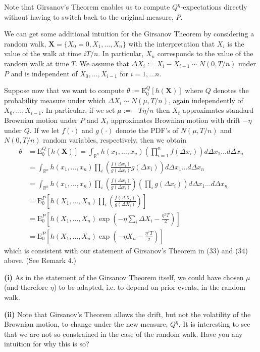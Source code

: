 \begin{remark}
Note that Girsanov's Theorem enables us to compute $Q^\eta$-expectations directly without having to switch back to the original measure, $P$.
\end{remark}

We can get some additional intuition for the Girsanov Theorem by considering a random walk, $\mathbf{X}=\{X_0=0,X_1,\ldots,X_n\}$ with the interpretation that $X_i$ is the value of the walk at time $iT/n$. In particular, $X_n$ corresponds to the value of the random walk at time $T$. We assume that $\Delta X_i:=X_i-X_{i-1}\sim N(0,T/n)$ under $P$ and is independent of $X_0,\ldots,X_{i-1}$ for $i=1,\ldots n$.

\begin{example}
Suppose now that we want to compute $\theta:=\mathrm{E}_0^Q[h(\mathbf{X})]$ where $Q$ denotes the probability measure under which $\Delta X_i\sim N(\mu,T/n)$, again independently of $X_0,\ldots,X_{i-1}$. In particular, if we set $\mu:=-T\eta/n$ then $X_t$ approximates standard Brownian motion under $P$ and $X_t$ approximates Brownian motion with drift $-\eta$ under $Q$. If we let $f(\cdot)$ and $g(\cdot)$ denote the PDF's of $N(\mu,T/n)$ and $N(0,T/n)$ random variables, respectively, then we obtain
\begin{align*}
\theta &= \mathrm{E}_0^Q[h(\mathbf{X})] = \int_{\mathbb{R}^n} h(x_1,\ldots,x_n) \left(\prod_{i=1}^n f(\Delta x_i)\right) d\Delta x_1\ldots d\Delta x_n \\
&= \int_{\mathbb{R}^n} h(x_1,\ldots,x_n) \prod_i \left(\frac{f(\Delta x_i)}{g(\Delta x_i)} g(\Delta x_i)\right) d\Delta x_1\ldots d\Delta x_n \\
&= \int_{\mathbb{R}^n} h(x_1,\ldots,x_n) \prod_i \left(\frac{f(\Delta x_i)}{g(\Delta x_i)}\right) \left(\prod_i g(\Delta x_i)\right) d\Delta x_1\ldots d\Delta x_n \\
&= \mathrm{E}_0^P\left[h(X_1,\ldots,X_n) \prod_i \left(\frac{f(\Delta X_i)}{g(\Delta X_i)}\right)\right] \\
&= \mathrm{E}_0^P\left[h(X_1,\ldots,X_n) \exp\left(-\eta \sum_i \Delta X_i - \frac{\eta^2 T}{2}\right)\right] \\
&= \mathrm{E}_0^P\left[h(X_1,\ldots,X_n) \exp\left(-\eta X_n - \frac{\eta^2 T}{2}\right)\right]
\end{align*}
which is consistent with our statement of Girsanov's Theorem in (33) and (34) above. (See Remark 4.)
\end{example}

\begin{remark}
\textbf{(i)} As in the statement of the Girsanov Theorem itself, we could have chosen $\mu$ (and therefore $\eta$) to be adapted, i.e. to depend on prior events, in the random walk.

\textbf{(ii)} Note that Girsanov's Theorem allows the drift, but not the volatility of the Brownian motion, to change under the new measure, $Q^\eta$. It is interesting to see that we are not so constrained in the case of the random walk. Have you any intuition for why this is so?
\end{remark}

